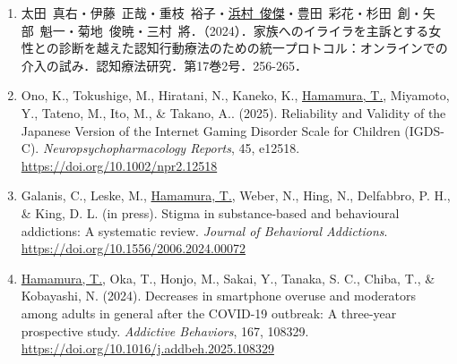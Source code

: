\documentclass[11pt,a4paper]{article}
\begin{document}
\begin{enumerate}
	\item 太田\ 真右・伊藤\ 正哉・重枝\ 裕子・\underline{浜村\ 俊傑}・豊田\ 彩花・杉田\ 創・矢部\ 魁一・菊地\ 俊暁・三村\ 將．（2024）．家族へのイライラを主訴とする女性との診断を越えた認知行動療法のための統一プロトコル：オンラインでの介入の試み．認知療法研究．第17巻2号．256-265．
	\item Ono, K., Tokushige, M., Hiratani, N., Kaneko, K., \underline{Hamamura, T.}, Miyamoto, Y., Tateno, M., Ito, M., \& Takano, A.. (2025). Reliability and Validity of the Japanese Version of the Internet Gaming Disorder Scale for Children (IGDS-C). \textit{Neuropsychopharmacology Reports}, 45, e12518. \url{https://doi.org/10.1002/npr2.12518}
	\item Galanis, C., Leske, M., \underline{Hamamura, T.}, Weber, N., Hing, N., Delfabbro, P. H., \& King, D. L. (in press). Stigma in substance-based and behavioural addictions: A systematic review. \textit{Journal of Behavioral Addictions}. \url{https://doi.org/10.1556/2006.2024.00072}
	\item \underline{Hamamura, T.}, Oka, T., Honjo, M., Sakai, Y., Tanaka, S. C., Chiba, T., \& Kobayashi, N. (2024). Decreases in smartphone overuse and moderators among adults in general after the COVID-19 outbreak: A three-year prospective study. \textit{Addictive Behaviors}, 167, 108329. \url{https://doi.org/10.1016/j.addbeh.2025.108329}
\end{enumerate}
\end{document}
